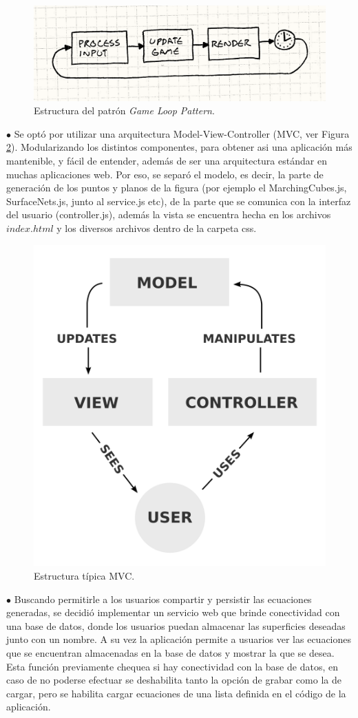 \documentclass[12pt]{article}
\begin{document}
\begin{figure}[h]
\includegraphics[width =0.8\linewidth, center]{gameloop.png}
\caption{Estructura del patrón \textit{Game Loop Pattern}\cite{patterns}.}
\label{glp}
\end{figure}

$\bullet$ Se optó por utilizar una arquitectura Model-View-Controller (MVC, ver Figura \ref{mvc}). Modularizando los distintos componentes, para obtener asi una aplicación más mantenible, y fácil de entender, además de ser una arquitectura estándar en muchas aplicaciones web. Por eso, se separó el modelo, es decir, la parte de generación de los puntos y planos de la figura (por ejemplo el MarchingCubes.js, SurfaceNets.js, junto al service.js etc), de la parte que se comunica con la interfaz del usuario (controller.js), además la vista se encuentra hecha en los archivos $index.html$ y los diversos archivos dentro de la carpeta css.


\begin{figure}[h!]
\includegraphics[width =0.5\linewidth, center]{mvc.png}
\caption{Estructura típica MVC.}
\label{mvc}
\end{figure}
$\bullet$ Buscando permitirle a los usuarios compartir y persistir las ecuaciones generadas, se decidió implementar un servicio web que brinde conectividad con una base de datos, donde los usuarios puedan almacenar las superficies deseadas junto con un nombre. A su vez la aplicación permite a usuarios ver las ecuaciones que se encuentran almacenadas en la base de datos y mostrar la que se desea. Esta función previamente chequea si hay conectividad con la base de datos, en caso de no poderse efectuar se deshabilita tanto la opción de grabar como la de cargar, pero se habilita cargar ecuaciones de una lista definida en el código de la aplicación. 
\end{document}
